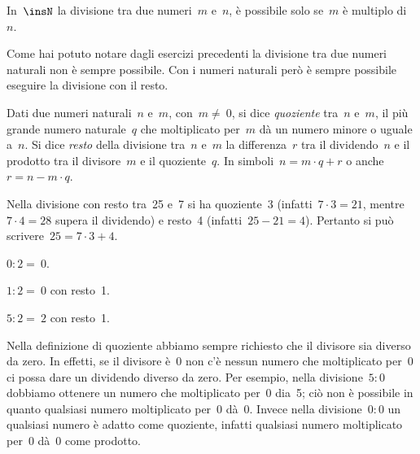 \osservazione In~$\insN$ la divisione tra due numeri~$m$ e~$n$, è possibile solo se~$m$ è multiplo di~$n$.

\vspazio\ovalbox{\risolvi\ref{ese:1.2}}\vspazio

Come hai potuto notare dagli esercizi precedenti la divisione tra due numeri naturali non è sempre possibile.
Con i numeri naturali però è sempre possibile eseguire la divisione con il resto.

\begin{definizione}
 Dati due numeri naturali~$n$ e~$m$, con~$m\neq~0$, si dice \emph{quoziente} tra~$n$ e~$m$, il più grande
numero naturale~$q$ che moltiplicato per~$m$ dà un numero minore o uguale a~$n$. Si dice \emph{resto} della divisione
tra~$n$ e~$m$ la differenza~$r$ tra il dividendo~$n$ e il prodotto tra il divisore~$m$ e il quoziente~$q$.
In simboli~$n=m\cdot q + r$ o anche~$r=n-m\cdot q$.
\end{definizione}

\begin{exrig}
 \begin{esempio}
 Nella divisione con resto tra~25 e~7 si ha quoziente~3 (infatti~$7\cdot 3=21$,
 mentre~$7\cdot 4=28$ supera il dividendo) e resto~4 (infatti~$25-21=4$).
 Pertanto si può scrivere~$25=7\cdot 3+4$.

 
 \end{esempio}

 \begin{esempio}
 $0:2 =~0$.
 \end{esempio}

 \begin{esempio}
$1:2 =~0$ con resto~1.
 \end{esempio}

 \begin{esempio}
$5:2 =~2$ con resto~1.
 \end{esempio}
\end{exrig}

\osservazione Nella definizione di quoziente abbiamo sempre richiesto che il divisore sia diverso da zero. In effetti, se il divisore è~0 non c'è nessun numero che moltiplicato per~0 ci possa dare un dividendo diverso da zero.
Per esempio, nella divisione~$5:0$ dobbiamo ottenere un numero che moltiplicato per~0 dia~5; ciò non è
possibile in quanto qualsiasi numero moltiplicato per~0 dà~0.
Invece nella divisione~$0:0$ un qualsiasi numero è adatto come quoziente, infatti qualsiasi numero
moltiplicato per~0 dà~0 come prodotto.

